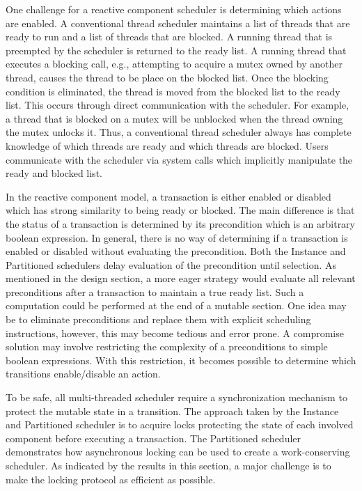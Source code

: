 One challenge for a reactive component scheduler is determining which actions are enabled.
A conventional thread scheduler maintains a list of threads that are ready to run and a list of threads that are blocked.
A running thread that is preempted by the scheduler is returned to the ready list.
A running thread that executes a blocking call, e.g., attempting to acquire a mutex owned by another thread, causes the thread to be place on the blocked list.
Once the blocking condition is eliminated, the thread is moved from the blocked list to the ready list.
This occurs through direct communication with the scheduler.
For example, a thread that is blocked on a mutex will be unblocked when the thread owning the mutex unlocks it.
Thus, a conventional thread scheduler always has complete knowledge of which threads are ready and which threads are blocked.
Users communicate with the scheduler via system calls which implicitly manipulate the ready and blocked list.

In the reactive component model, a transaction is either enabled or disabled which has strong similarity to being ready or blocked.
The main difference is that the status of a transaction is determined by its precondition which is an arbitrary boolean expression.
In general, there is no way of determining if a transaction is enabled or disabled without evaluating the precondition.
Both the Instance and Partitioned schedulers delay evaluation of the precondition until selection.
As mentioned in the design section, a more eager strategy would evaluate all relevant preconditions after a transaction to maintain a true ready list.
Such a computation could be performed at the end of a mutable section.
One idea may be to eliminate preconditions and replace them with explicit scheduling instructions, however, this may become tedious and error prone.
A compromise solution may involve restricting the complexity of a preconditions to simple boolean expressions.
With this restriction, it becomes possible to determine which transitions enable/disable an action.

To be safe, all multi-threaded scheduler require a synchronization mechanism to protect the mutable state in a transition.
The approach taken by the Instance and Partitioned scheduler is to acquire locks protecting the state of each involved component before executing a transaction.
The Partitioned scheduler demonstrates how asynchronous locking can be used to create a work-conserving scheduler.
As indicated by the results in this section, a major challenge is to make the locking protocol as efficient as possible.

